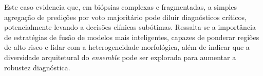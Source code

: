 Este caso evidencia que, em biópsias complexas e fragmentadas, a simples agregação de predições por voto majoritário pode diluir diagnósticos críticos, potencialmente levando a decisões clínicas subótimas. Ressalta-se a importância de estratégias de fusão de modelos mais inteligentes, capazes de ponderar regiões de alto risco e lidar com a heterogeneidade morfológica, além de indicar que a diversidade arquitetural do \textit{ensemble} pode ser explorada para aumentar a robustez diagnóstica.

